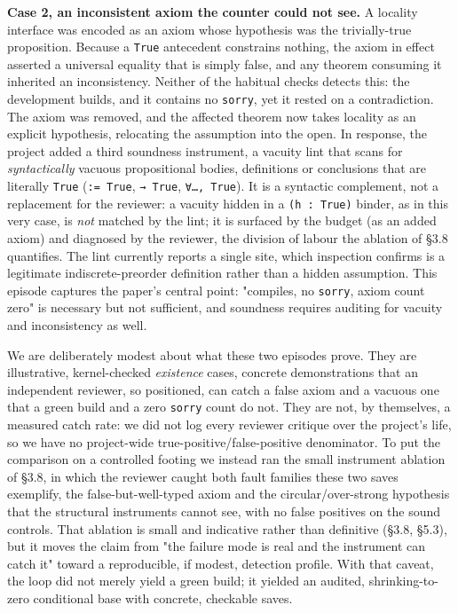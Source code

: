 \documentclass[11pt]{article}
\begin{document}
\textbf{Case 2, an inconsistent axiom the counter could not see.} A locality interface was encoded as an
axiom whose hypothesis was the trivially-true proposition. Because a \texttt{True} antecedent constrains
nothing, the axiom in effect asserted a universal equality that is simply false, and any theorem
consuming it inherited an inconsistency. Neither of the habitual checks detects this: the
development builds, and it contains no \texttt{sorry}, yet it rested on a contradiction. The axiom was
removed, and the affected theorem now takes locality as an explicit hypothesis, relocating the
assumption into the open. In response, the project added a third soundness instrument, a vacuity
lint that scans for \emph{syntactically} vacuous propositional bodies, definitions or conclusions that
are literally \texttt{True} (\texttt{:= True}, \texttt{→ True}, \texttt{∀…, True}). It is a syntactic complement, not a
replacement for the reviewer: a vacuity hidden in a \texttt{(h : True)} binder, as in this very case, is
\emph{not} matched by the lint; it is surfaced by the budget (as an added axiom) and diagnosed by the
reviewer, the division of labour the ablation of §3.8 quantifies. The lint currently reports a
single site, which inspection confirms is a legitimate indiscrete-preorder definition rather than a
hidden assumption. This episode captures the paper's
central point: "compiles, no \texttt{sorry}, axiom count zero" is necessary but not sufficient, and
soundness requires auditing for vacuity and inconsistency as well.

We are deliberately modest about what these two episodes prove. They are illustrative, kernel-checked
\emph{existence} cases, concrete demonstrations that an independent reviewer, so positioned, can catch a
false axiom and a vacuous one that a green build and a zero \texttt{sorry} count do not. They are not, by
themselves, a measured catch rate: we did not log every reviewer critique over the project's life,
so we have no project-wide true-positive/false-positive denominator. To put the comparison on a
controlled footing we instead ran the small instrument ablation of §3.8, in which the reviewer caught
both fault families these two saves exemplify, the false-but-well-typed axiom and the
circular/over-strong hypothesis that the structural instruments cannot see, with no false positives
on the sound controls. That ablation is small and indicative rather than definitive (§3.8, §5.3), but
it moves the claim from "the failure mode is real and the instrument can catch it" toward a
reproducible, if modest, detection profile. With that caveat, the loop did not merely yield a green
build; it yielded an audited, shrinking-to-zero conditional base with concrete, checkable saves.
\end{document}
